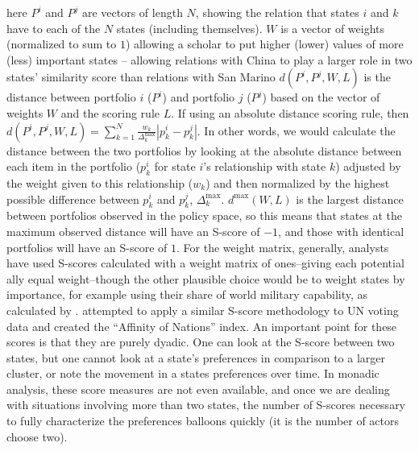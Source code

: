 \noindent here $P^{i}$ and $P^{j}$ are vectors of length $N$, showing the relation that states $i$ and $k$ have to each of the $N$ states (including themselves). $W$ is a vector of weights (normalized to sum to $1$) allowing a scholar to put higher (lower) values of more (less) important states -- allowing relations with China to play a larger role in two states' similarity score than relations with San Marino $d(P^i, P^j, W, L)$ is the distance between portfolio $i$ ($P^i$) and portfolio $j$ ($P^j$) based on the vector of weights $W$ and the scoring rule $L$. If using an absolute distance scoring rule, then $d(P^i, P^j, W, L) = \sum_{k = 1}^N \frac{w_k}{\Delta^\text{max}_{k}} |p^i_k - p^j_k|$. In other words, we would calculate the distance between the two portfolios by looking at the absolute distance between each item in the portfolio ($p^i_{k}$ for state $i$'s relationship with state $k$) adjusted by the weight given to this relationship ($w_{k}$) and then normalized by the highest possible difference between $p^i_{k}$ and $p^j_{k}$,  $\Delta^\text{max}_{k}$. $d^{\text{max}}(W,L)$ is the largest distance between portfolios observed in the policy space, so this means that states at the maximum observed distance will have an S-score of $-1$, and those with identical portfolios will have an S-score of $1$. For the weight matrix, generally, analysts have used S-scores calculated with a weight matrix of ones--giving each potential ally equal weight--though the other plausible choice would be to weight states by importance, for example using their share of world military capability, as calculated by \citet{singer:small:1995}. \citet{gartzke:1998} attempted to apply a similar S-score methodology to UN voting data and created the ``Affinity of Nations'' index. An important point for these scores is that they are purely dyadic. One can look at the S-score between two states, but one cannot look at a state's preferences in comparison to a larger cluster, or note the movement in a states preferences over time. In monadic analysis, these score measures are not even available, and once we are dealing with situations involving more than two states, the number of S-scores necessary to fully characterize the preferences balloons quickly (it is the number of actors choose two). 

